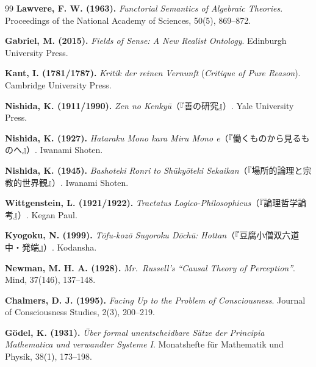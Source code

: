 \documentclass[11pt,a4paper]{ltjsarticle}
\theoremstyle{definition}
\theoremstyle{plain}
\begin{document}
\begin{thebibliography}{99}
\textbf{Lawvere, F. W. (1963).} \textit{Functorial Semantics of Algebraic Theories}. Proceedings of the National Academy of Sciences, 50(5), 869--872.

\textbf{Gabriel, M. (2015).} \textit{Fields of Sense: A New Realist Ontology}. Edinburgh University Press.

\textbf{Kant, I. (1781/1787).} \textit{Kritik der reinen Vernunft} (\textit{Critique of Pure Reason}). Cambridge University Press.

\textbf{Nishida, K. (1911/1990).} \textit{Zen no Kenky\=u}（『善の研究』）. Yale University Press.

\textbf{Nishida, K. (1927).} \textit{Hataraku Mono kara Miru Mono e}（『働くものから見るものへ』）. Iwanami Shoten.

\textbf{Nishida, K. (1945).} \textit{Bashoteki Ronri to Sh\=uky\=oteki Sekaikan}（『場所的論理と宗教的世界観』）. Iwanami Shoten.

\textbf{Wittgenstein, L. (1921/1922).} \textit{Tractatus Logico-Philosophicus}（『論理哲学論考』）. Kegan Paul.

\textbf{Kyogoku, N. (1999).} \textit{T\=ofu-koz\=o Sugoroku D\=och\=u: Hottan}（『豆腐小僧双六道中・発端』）. Kodansha.

\textbf{Newman, M. H. A. (1928).} \textit{Mr.\ Russell's ``Causal Theory of Perception''}. Mind, 37(146), 137--148.

\textbf{Chalmers, D. J. (1995).} \textit{Facing Up to the Problem of Consciousness}. Journal of Consciousness Studies, 2(3), 200--219.

\textbf{G\"odel, K. (1931).} \textit{\"Uber formal unentscheidbare S\"atze der Principia Mathematica und verwandter Systeme I}. Monatshefte f\"ur Mathematik und Physik, 38(1), 173--198.

\end{thebibliography}
\end{document}
